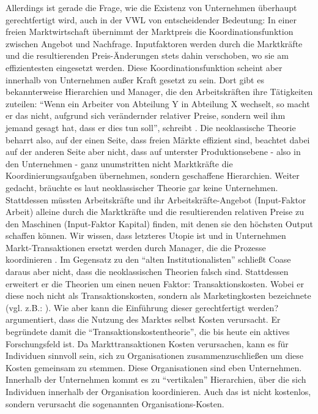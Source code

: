 Allerdings ist gerade die Frage, wie die Existenz von Unternehmen überhaupt gerechtfertigt wird, auch in der VWL von entscheidender Bedeutung: In einer freien Marktwirtschaft übernimmt der Marktpreis die Koordinationsfunktion zwischen Angebot und Nachfrage. Inputfaktoren werden durch die Marktkräfte und die resultierenden Preis-Änderungen stets dahin verschoben, wo sie am effizientesten eingesetzt werden. Diese Koordinationsfunktion scheint aber innerhalb von Unternehmen außer Kraft gesetzt zu sein. Dort gibt es bekannterweise Hierarchien und Manager, die den Arbeitskräften ihre Tätigkeiten zuteilen: "`Wenn ein Arbeiter von Abteilung Y in Abteilung X wechselt, so macht er das nicht, aufgrund sich verändernder relativer Preise, sondern weil ihm jemand gesagt hat, dass er dies tun soll"', schreibt \textcite[S. 387]{Coase1937}. Die neoklassische Theorie beharrt also, auf der einen Seite, dass freien Märkte effizient sind, beachtet dabei auf der anderen Seite aber nicht, dass auf unterster Produktionsebene - also in den Unternehmen - ganz unumstritten nicht Marktkräfte die Koordinierungsaufgaben übernehmen, sondern geschaffene Hierarchien. Weiter gedacht, bräuchte es laut neoklassischer Theorie gar keine Unternehmen. Stattdessen müssten Arbeitskräfte und ihr Arbeitskräfte-Angebot (Input-Faktor Arbeit) alleine durch die Marktkräfte und die resultierenden relativen Preise zu den Maschinen (Input-Faktor Kapital) finden, mit denen sie den höchsten Output schaffen können. Wir wissen, dass letzteres Utopie ist und in Unternehmen Markt-Transaktionen ersetzt werden durch Manager, die die Prozesse koordinieren \parencite[S. 388]{Coase1937}. Im Gegensatz zu den "`alten Institutionalisten"' schließt Coase daraus aber nicht, dass die neoklassischen Theorien falsch sind. Stattdessen erweitert er die Theorien um einen neuen Faktor: Transaktionskosten. Wobei er diese noch nicht als Transaktionskosten, sondern als Marketingkosten bezeichnete (vgl. z.B.: \textcite[S. 392]{Coase1937}). Wie aber kann die Einführung dieser gerechtfertigt werden? \textcite[S. 390]{Coase1937} argumentiert, dass die Nutzung des Marktes selbst Kosten verursacht. Er begründete damit die "`Transaktionskostentheorie"', die bis heute ein aktives Forschungsfeld ist. Da Markttransaktionen Kosten verursachen, kann es für Individuen sinnvoll sein, sich zu Organisationen zusammenzuschließen um diese Kosten gemeinsam zu stemmen. Diese Organisationen sind eben Unternehmen. Innerhalb der Unternehmen kommt es zu "`vertikalen"' \parencite[S. 388]{Coase1937} Hierarchien, über die sich Individuen innerhalb der Organisation koordinieren. Auch das ist nicht kostenlos, sondern verursacht die sogenannten Organisations-Kosten.

